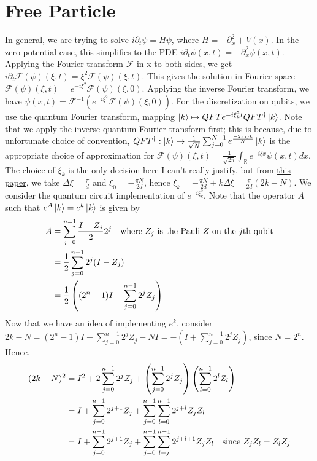\documentclass[10pt]{article}
\begin{document}
\section*{Free Particle}
In general, we are trying to solve $i \partial_t \psi = H \psi$, where 
$H = -\partial_x^2 + V(x)$. In the zero potential case, this simplifies to the PDE
$i \partial_t \psi(x, t) = -\partial_x^2 \psi(x, t)$. Applying the Fourier transform
$\mathcal{F}$ in x to both sides, we get $i \partial_t \mathcal{F}(\psi)(\xi, t) = \xi^2 \mathcal{F}(\psi)(\xi, t)$.
This gives the solution in Fourier space $\mathcal{F}(\psi)(\xi, t) = e^{-i \xi^2}\mathcal{F}(\psi)(\xi, 0)$.
Applying the inverse Fourier transform, we have $\psi(x, t) = \mathcal{F}^{-1}\left(e^{-i \xi^2} \mathcal{F}(\psi)(\xi, 0)\right)$.
For the discretization on qubits, we use the quantum Fourier transform, mapping
$\ket{k} \mapsto QFT e^{-i \xi_k^2 t} QFT^\dag \ket{k}$. Note that we apply
the inverse quantum Fourier transform first; this is because, due to unfortunate
choice of convention, $QFT^\dag: \ket{k} \mapsto \frac{1}{\sqrt{N}} \sum_{j=0}^{N-1} e^\frac{-2\pi ijk}{N} \ket{k}$
is the appropriate choice of approximation for $\mathcal{F}(\psi)(\xi, t) = \frac{1}{\sqrt{2\pi}}\int_{\mathbb{R}} e^{-i \xi x} \psi(x, t) dx$.
The choice of $\xi_k$ is the only decision here I can't really justify, but from \href{https://arxiv.org/pdf/1307.3318}{this paper},
we take $\Delta \xi = \frac{\pi}{d}$ and $\xi_0 = -\frac{\pi N}{2d}$, hence $\xi_k = -\frac{\pi N}{2d} + k \Delta \xi 
= \frac{\pi}{2d}(2k - N)$. 
\newline
We consider the quantum circuit implementation of $e^{-i \xi_k^2}$. Note that the
operator $A$ such that $e^A \ket{k} = e^k \ket{k}$ is given by
\begin{align*}
    A &= \sum_{j=0}^{n=1} \frac{I - Z_j}{2}2^j \text{\quad where $Z_j$ is the Pauli $Z$ on the $j$th qubit} \\
      &= \frac{1}{2} \sum_{j=0}^{n-1} 2^j(I - Z_j) \\
      &= \frac{1}{2}\left((2^n-1)I - \sum_{j=0}^{n-1} 2^j Z_j\right)
\end{align*}
Now that we have an idea of implementing $e^k$, consider $2k - N = (2^n - 1)I - \sum_{j=0}^{n-1} 2^j Z_j - NI
= -(I + \sum_{j=0}^{n-1}2^j Z_j)$, since $N = 2^n$. Hence,
\begin{align*}
    (2k-N)^2 &= I^2 + 2 \sum_{j=0}^{n-1} 2^j Z_j + \left( \sum_{j=0}^{n-1} 2^j Z_j \right) \left( \sum_{l=0}^{n-1} 2^l Z_l \right) \\
             &= I + \sum_{j=0}^{n-1} 2^{j+1} Z_j + \sum_{j=0}^{n-1} \sum_{l=0}^{n-1} 2^{j+l} Z_j Z_l \\
             &= I + \sum_{j=0}^{n-1} 2^{j+1} Z_j + \sum_{j=0}^{n-1} \sum_{l=j}^{n-1} 2^{j+l+1} Z_j Z_l \text{\quad since $Z_j Z_l = Z_l Z_j$}
\end{align*}
\end{document}
